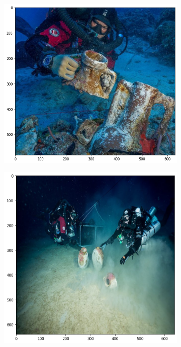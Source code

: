 \documentclass[a4paper, 11pt, oneside]{article}
\begin{document}
\begin{figure}[ht]
\begin{subfigure}[ht]{0.4\textwidth}
      \includegraphics[width=\textwidth]{val_3.png}
  \end{subfigure}
  \begin{subfigure}[ht]{0.4\textwidth}
    \centering
    \includegraphics[width=\textwidth]{val_2.png}
  \end{subfigure}

\end{figure}
\end{document}
